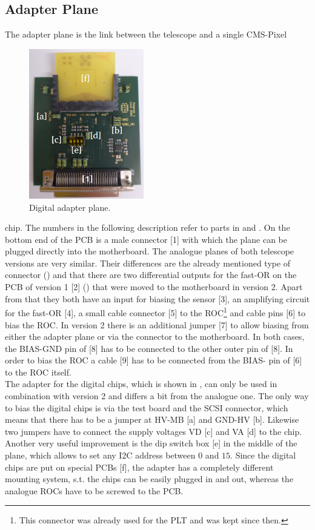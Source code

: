 \documentclass[british,11pt,a4paper]{memoir}
\begin{document}
\subsection{Adapter Plane}\label{s211}
The adapter plane is the link between the telescope and a single \ac{CMS}-Pixel 
\begin{figure}
	\vspace*{-10pt}
	\includegraphics[width=5cm]{setup/digada}
	\caption{Digital adapter plane.}
	\label{p6}
	\vspace*{-5pt}
\end{figure} 
chip. The numbers in the following description refer to parts in  and . On the bottom end of the \ac{PCB} is a male connector [1] with which the plane can be plugged directly into the motherboard. The analogue planes of both telescope versions are very similar. Their differences are the already mentioned type of connector () and that there are two differential outputs for the fast-OR on the PCB of version 1 [2] () that were moved to the motherboard in version 2. Apart from that they both have an input for biasing the sensor [3], an amplifying circuit for the fast-OR [4], a small cable connector [5] to the \ac{ROC}\footnote[3]{This connector was already used for the \ac{PLT} and was kept since then.} and cable pins [6] to bias the \ac{ROC}. In version 2 there is an additional jumper [7] to allow biasing from either the adapter plane or via the connector to the motherboard. In both cases, the BIAS-GND pin of [8] has to be connected to the other outer pin of [8]. In order to bias the \ac{ROC} a cable [9] has to be connected from the BIAS- pin of [6] to the \ac{ROC} itself.\\
The adapter for the digital chips, which is shown in , can only be used in combination with version 2 and differs a bit from the analogue one. The only way to bias the digital chips is via the test board and the SCSI connector, which means that there has to be a jumper at HV-MB [a] and GND-HV [b]. Likewise two jumpers have to connect the supply voltages VD [c] and VA [d] to the chip. Another very useful improvement is the dip switch box [e] in the middle of the plane, which allows to set any \ac{I2C} address between $0$ and $15$. Since the digital chips are put on special \ac{PCB}s [f], the adapter has a completely different mounting system, s.t. the chips can be easily plugged in and out, whereas the analogue \ac{ROC}s have to be screwed to the \ac{PCB}.
\end{document}
